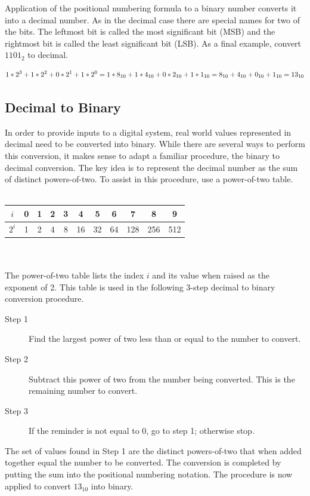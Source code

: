 Application of the positional numbering formula to a binary number
converts it into a decimal number.  As in the decimal case
there are special names for two of the bits. The leftmost bit is
called the most significant bit (MSB) and the
rightmost bit is called the least significant
bit (LSB).  As a final example, convert $1101_2$ to decimal.

$$1*2^3 + 1*2^2 + 0*2^1 + 1*2^0 = \\
1*8_{10} + 1*4_{10} + 0*2_{10} + 1*1_{10} = \\
8_{10} + 4_{10} + 0_{10} + 1_{10} = 13_{10}$$
\label{page:bin2dec}

\subsection{Decimal to Binary}
In order to provide inputs to a digital system, real world values
represented in decimal need to be converted into binary.
While there are several ways to perform
this conversion, it makes sense to adapt a familiar procedure,
the binary to decimal conversion.  The key idea is to represent the
decimal number as the sum of distinct powers-of-two.  To assist in this
procedure, use a power-of-two table.
\\ \\
\begin{tabular}{|c|c|c|c|c|c|c|c|c|c|c|}\hline
    $i$   & 0 & 1 &  2 &  3 &  4 &  5 &  6 &  7  &  8  &  9  \\ \hline
    $2^i$ & 1 & 2 &  4 &  8 & 16 & 32 & 64 & 128 & 256 &  512\\ \hline
\end{tabular}
\\ \\
The power-of-two table lists the index $i$ and its value when
raised as the exponent of 2.  This table is used in the following
3-step decimal to binary conversion procedure.

\begin{description}
    \item [Step 1] Find the largest power of two less than or equal to the
        number to convert.
    \item [Step 2] Subtract this power of two from the number being converted.
        This is the remaining number to convert.
    \item [Step 3] If the reminder is not equal to 0, go to step 1; otherwise stop.
\end{description}

The set of values found in Step 1 are the distinct powers-of-two that
when added together equal the number to be converted.  The conversion
is completed by putting the sum into the positional numbering notation.
The procedure is now applied to convert $13_{10}$ into binary.

